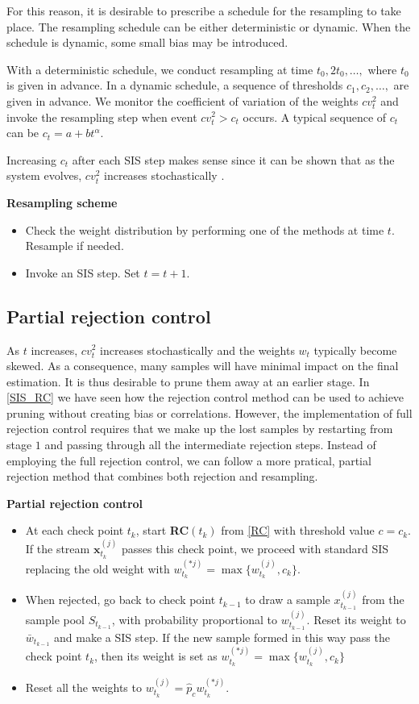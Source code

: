 \documentclass[times, utf8, diplomski]{fer}
\begin{document}
For this reason, it is desirable to prescribe a schedule for the resampling to take place. The resampling schedule can be either deterministic or dynamic. When the schedule is dynamic, some small bias may be introduced.

With a deterministic schedule, we conduct resampling at time $t_0, 2t_0, \ldots,$ where $t_0$ is given in advance. In a dynamic schedule, a sequence of thresholds $c_1, c_2, \ldots,$ are given in advance. We monitor the coefficient of variation of the weights $cv_t^2$ and invoke the resampling step when event $cv_t^2 > c_t$ occurs. A typical sequence of $c_t$ can be $c_t = a + bt^\alpha$.

Increasing $c_t$ after each SIS step makes sense since it can be shown that as the system evolves, $cv_t^2$ increases stochastically \cite{Kong94}.

\vspace{10mm}
\textbf{Resampling scheme}
\begin{itemize}
\item{Check the weight distribution by performing one of the methods at time $t$. Resample if needed.}
\item{Invoke an SIS step. Set $t = t + 1$.}
\end{itemize}


\subsection{Partial rejection control}
As $t$ increases, $cv_t^2$ increases stochastically and the weights $w_t$ typically become skewed. As a consequence, many samples  will have minimal impact on the final estimation. It is thus desirable to prune them away at an earlier stage. In \ref{SIS_RC} we have seen how the rejection control method can be used to achieve pruning without creating bias or correlations. However, the implementation of full rejection control requires that we make up the lost samples by restarting from stage $1$ and passing through all the intermediate rejection steps. Instead of employing the full rejection control, we can follow a more pratical, partial rejection method that combines both rejection and resampling. 


\textbf{Partial rejection control}
\begin{itemize}
\item{At each check point $t_k$, start \textbf{RC}$(t_k)$ from \ref{RC} with threshold value $c=c_k$. If the stream $\mathbf{x}_{t_k}^{(j)}$ passes this check point, we proceed with standard SIS replacing the old weight with $w_{t_k}^{(*j)} = \max \{w_{t_k}^{(j)}, c_k\}$.}
\item{When rejected, go back to check point $t_{k - 1}$ to draw a sample $x_{t_{k - 1}}^{(j)}$ from the sample pool $S_{t_{k - 1}}$, with probability proportional to $w_{t_{k - 1}}^{(j)}$. Reset its weight to $\bar{w}_{t_{k - 1}}$ and make a SIS step. If the new sample formed in this way pass the check point $t_k$, then its weight is set as $w_{t_k}^{(*j)} = \max \{w_{t_k}^{(j)}, c_k \} $}
\item{Reset all the weights to $w_{t_k}^{(j)} = \hat{p}_c w_{t_k}^{(*j)}$.}
\end{itemize}
\end{document}
